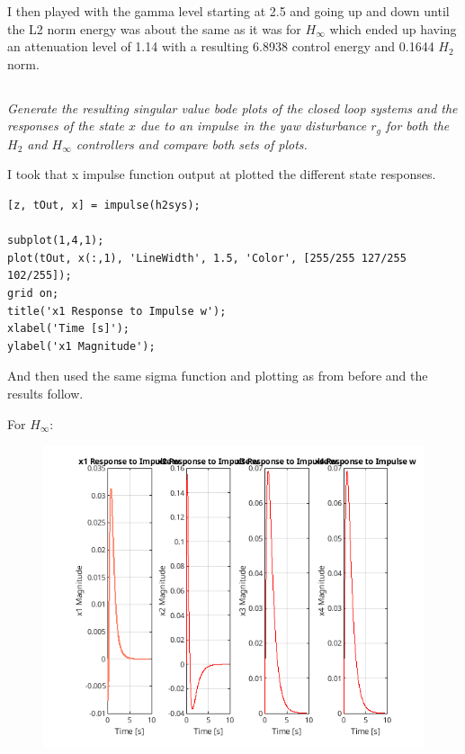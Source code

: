 \documentclass[12pt, letterpaper]{article}
\begin{document}
I then played with the gamma level starting at 2.5 and going up and down until the L2 norm energy was about the same as it was for $H_{\infty}$ which ended up having an attenuation level of 1.14 with a resulting 6.8938 control energy and 0.1644 $H_2$ norm.

\subsection{}
\textit{
Generate the resulting singular value bode plots of the closed loop systems and the responses of the state $x$ due to an impulse in the yaw disturbance $r_g$ for both the $H_2$ and $H_\infty$ controllers and compare both sets of plots.
}

I took that x impulse function output at plotted the different state responses.

\begin{lstlisting}[style=matlabstyle]
[z, tOut, x] = impulse(h2sys);

subplot(1,4,1);
plot(tOut, x(:,1), 'LineWidth', 1.5, 'Color', [255/255 127/255 102/255]);
grid on;
title('x1 Response to Impulse w');
xlabel('Time [s]');
ylabel('x1 Magnitude');    
\end{lstlisting}

And then used the same sigma function and plotting as from before and the results follow.

For $H_{\infty}$:

\begin{figure}[H]
    \centering
    \includegraphics{hinfXResponseImpulse.png}
\end{figure}
\end{document}
